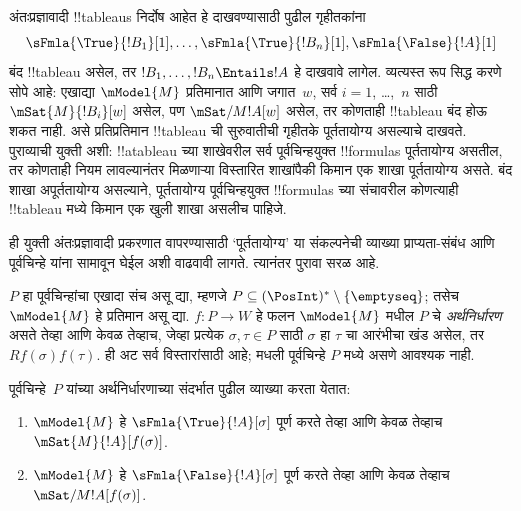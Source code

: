 \documentclass[../../../include/open-logic-section]{subfiles}
\begin{document}


\begin{explain}
  अंतःप्रज्ञावादी !!{tableau}s निर्दोष आहेत हे
  दाखवण्यासाठी पुढील गृहीतकांना
  \[
  \sFmla{\True}{!B_1}[1], \dots, \sFmla{\True}{!B_n}[1], \sFmla{\False}{!A}[1]
  \]
  बंद !!{tableau} असेल, तर $!B_1, \dots, !B_n \Entails !A$
  हे दाखवावे लागेल. व्यत्यस्त रूप सिद्ध करणे सोपे आहे:
  एखाद्या $\mModel{M}$ प्रतिमानात आणि जगात~$w$,
  सर्व $i=1$, \dots,~$n$ साठी
  $\mSat{M}{!B_i}[w]$ असेल, पण
  $\mSat/{M}{!A}[w]$ असेल, तर कोणताही
  !!{tableau} बंद होऊ शकत नाही. असे
  प्रतिप्रतिमान !!{tableau} ची सुरुवातीची
  गृहीतके पूर्ततायोग्य असल्याचे दाखवते.
  पुराव्याची युक्ती अशी: !!a{tableau}
  च्या शाखेवरील सर्व पूर्वचिन्हयुक्त
  !!{formula}s पूर्ततायोग्य असतील, तर
  कोणताही नियम लावल्यानंतर मिळणाऱ्या
  विस्तारित शाखांपैकी किमान एक शाखा
  पूर्ततायोग्य असते. बंद शाखा अपूर्ततायोग्य
  असल्याने, पूर्ततायोग्य पूर्वचिन्हयुक्त
  !!{formula}s च्या संचावरील कोणत्याही
  !!{tableau} मध्ये किमान एक खुली शाखा
  असलीच पाहिजे.

  ही युक्ती अंतःप्रज्ञावादी प्रकरणात
  वापरण्यासाठी ‘पूर्ततायोग्य’ या संकल्पनेची
  व्याख्या प्राप्यता-संबंध आणि पूर्वचिन्हे
  यांना सामावून घेईल अशी वाढवावी लागते.
  त्यानंतर पुरावा सरळ आहे.
\end{explain}

\begin{defn}
  $P$ हा पूर्वचिन्हांचा एखादा संच असू द्या,
  म्हणजे $P \subseteq (\PosInt)^*
  \setminus \{\emptyseq\}$; तसेच
  $\mModel{M}$ हे प्रतिमान असू द्या.
  $f\colon P\to W$ हे फलन $\mModel{M}$ मधील
  $P$ चे \emph{अर्थनिर्धारण} असते तेव्हा आणि केवळ तेव्हाच,
  जेव्हा प्रत्येक $\sigma,\tau\in P$ साठी $\sigma$ हा
  $\tau$ चा आरंभीचा खंड असेल, तर $Rf(\sigma)f(\tau)$.
  ही अट सर्व विस्तारांसाठी आहे; मधली पूर्वचिन्हे
  $P$ मध्ये असणे आवश्यक नाही.

  पूर्वचिन्हे~$P$ यांच्या अर्थनिर्धारणाच्या
  संदर्भात पुढील व्याख्या करता येतात:
  \begin{enumerate}
  \item $\mModel{M}$ हे $\sFmla{\True}{!A}[\sigma]$
    पूर्ण करते तेव्हा आणि केवळ तेव्हाच
    $\mSat{M}{!A}[f(\sigma)]$.
  \item $\mModel{M}$ हे $\sFmla{\False}{!A}[\sigma]$
    पूर्ण करते तेव्हा आणि केवळ तेव्हाच
    $\mSat/{M}{!A}[f(\sigma)]$.
  \end{enumerate}
\end{defn}
\end{document}
